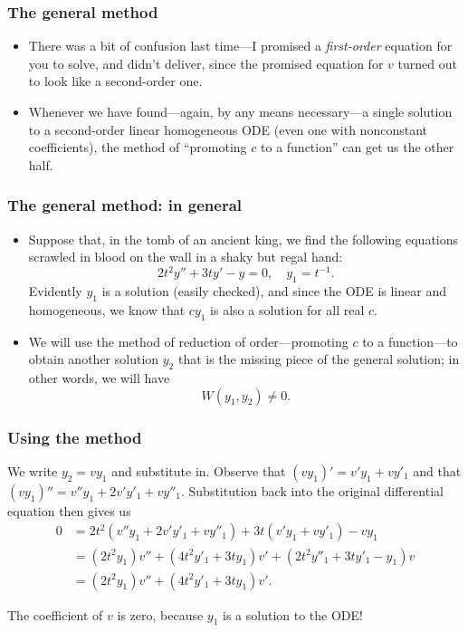 \begin{frame}

\frametitle{The general method}
\label{thegeneralmethod}

\begin{itemize}
\item There was a bit of confusion last time---I promised a \emph{first-order} equation for you to solve, and didn't deliver, since the promised equation for $ v $ turned out to look like a second-order one.

\item Whenever we have found---again, by any means necessary---a single solution to a second-order linear homogeneous ODE (even one with nonconstant coefficients), the method of ``promoting $ c $ to a function'' can get us the other half.

\end{itemize}

\end{frame}

\begin{frame}

\frametitle{The general method: in general}
\label{thegeneralmethod:ingeneral}

\begin{itemize}
\item Suppose that, in the tomb of an ancient king, we find the following equations scrawled in blood on the wall in a shaky but regal hand:
\[ 2t^2 y'' + 3t y' - y = 0, \quad y_1 = t^{-1}. \]
Evidently $ y_1 $ is a solution (easily checked), and since the ODE is linear and homogeneous, we know that $ cy_1 $ is also a solution for all real $ c $.

\item We will use the method of reduction of order---promoting $ c $ to a function---to obtain another solution $ y_2 $ that is the missing piece of the general solution; in other words, we will have
\[ W(y_1, y_2) \ne 0. \]

\end{itemize}

\end{frame}

\begin{frame}

\frametitle{Using the method}
\label{usingthemethod}

We write $ y_2 = vy_1 $ and substitute in. Observe that $ (vy_1)' = v'y_1 + vy'_1 $ and that $ (vy_1)'' = v''y_1 + 2v'y'_1 + vy''_1 $. Substitution back into the original differential equation then gives us
\begin{align*}
0 &= 2t^2 (v''y_1 + 2v'y'_1 + vy''_1) + 3t (v'y_1 + vy'_1) - vy_1 \\
  &= (2t^2 y_1) v'' + (4t^2 y'_1 + 3t y_1) v' + (2t^2 y''_1 + 3ty'_1 - y_1) v \\
  &= (2t^2 y_1) v'' + (4t^2 y'_1 + 3t y_1) v'.
\end{align*}

The coefficient of $ v $ is zero, because $ y_1 $ is a solution to the ODE!

\end{frame}


